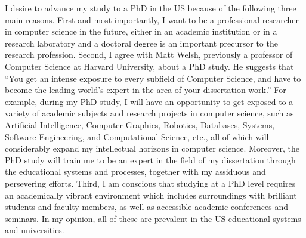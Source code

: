 \documentclass[10pt,a4paper,oneside]{report}
\begin{document}
\vspace{0.2cm}
I desire to advance my study to a PhD in the US because of the following three main reasons. First and most importantly, I want to be a professional researcher in computer science in the future, either in an academic institution or in a research laboratory and a doctoral degree is an important precursor to the research profession. Second, I agree with Matt Welsh, previously a professor of Computer Science at Harvard University, about a PhD study. He suggests that ``You get an intense exposure to every subfield of Computer Science, and have to become the leading world's expert in the area of your dissertation work.'' For example, during my PhD study, I will have an opportunity to get exposed to a variety of academic subjects and research projects in computer science, such as Artificial Intelligence, Computer Graphics, Robotics, Databases, Systems, Software Engineering, and Computational Science, etc., all of which will considerably expand my intellectual horizons in computer science. Moreover, the PhD study will train me to be an expert in the field of my dissertation through the educational systems and processes, together with my assiduous and persevering efforts. Third, I am conscious that studying at a PhD level requires an academically vibrant environment which includes surroundings with brilliant students and faculty members, as well as accessible academic conferences and seminars. In my opinion, all of these are prevalent in the US educational systems and universities.
\end{document}
